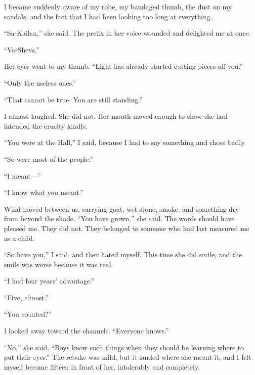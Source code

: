I became suddenly aware of my robe, my bandaged thumb, the dust on my sandals, and the fact that I had been looking too long at everything.\par

``Sa-Kailan,'' she said. The prefix in her voice wounded and delighted me at once.\par

``Va-Sheva.''\par

Her eyes went to my thumb. ``Light has already started cutting pieces off you.''\par

``Only the useless ones.''\par

``That cannot be true. You are still standing.''\par

I almost laughed. She did not. Her mouth moved enough to show she had intended the cruelty kindly.\par

``You were at the Hall,'' I said, because I had to say something and chose badly.\par

``So were most of the people.''\par

``I meant---''\par

``I know what you meant.''\par

Wind moved between us, carrying goat, wet stone, smoke, and something dry from beyond the shade. ``You have grown,'' she said. The words should have pleased me. They did not. They belonged to someone who had last measured me as a child.\par

``So have you,'' I said, and then hated myself. This time she did smile, and the smile was worse because it was real.\par

``I had four years' advantage.''\par

``Five, almost.''\par

``You counted?''\par

I looked away toward the channels. ``Everyone knows.''\par

``No,'' she said. ``Boys know such things when they should be learning where to put their eyes.'' The rebuke was mild, but it landed where she meant it, and I felt myself become fifteen in front of her, intolerably and completely.\par

